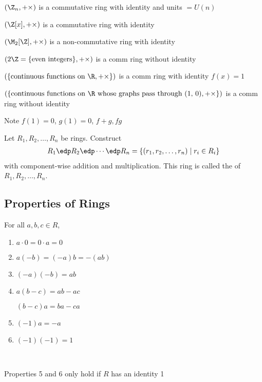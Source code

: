 \begin{example}
  \((\Z_n, +\times)\) is a commutative ring with identity and units \(=U(n)\)
\end{example}

\begin{example}
  \((\Z[x], +\times)\) is a commutative ring with identity
\end{example}

\begin{example}
  \((\M_2[\Z], +\times)\) is a non-commutative ring with identity
\end{example}

\begin{example}
  \((2\Z = \{\text{even integers}\}, +\times)\) is a comm ring without identity
\end{example}

\begin{example}
  \((\{\text{continuous functions on \R}, +\times\})\) is a comm ring with identity \(f(x) = 1\)
\end{example}

\begin{example}
  \((\{\text{continuous functions on \R\ whose graphs pass through (1, 0)}, +\times\})\) is a comm ring without identity

  Note \(f(1) = 0\), \(g(1) = 0\), \(f+g, fg\)
\end{example}

\begin{example}
  Let \(R_1, R_2, \ldots, R_n\) be rings. Construct
  \begin{align*}
    R_1\edp R_2\edp \cdots \edp R_n = \{(r_1, r_2, \ldots, r_n) \mid r_i\in R_i\}
  \end{align*}
  with component-wise addition and multiplication. This ring is called the  of \(R_1, R_2, \ldots, R_n\).
\end{example}

\subsection{Properties of Rings}

\begin{theorem}
  For all \(a,b,c\in R\),
\begin{enumerate}
  \item \(a\cdot 0 = 0\cdot a = 0\)
  \item \(a(-b) = (-a)b = -(ab)\)
  \item \((-a)(-b)=ab\)
  \item \(a(b-c) = ab-ac\)

  \((b-c)a = ba-ca\)
  \item \((-1)a = -a\)
  \item \((-1)(-1) = 1\)
\end{enumerate}\

\begin{note}
Properties 5 and 6 only hold if \(R\) has an identity 1
\end{note}
\end{theorem}

